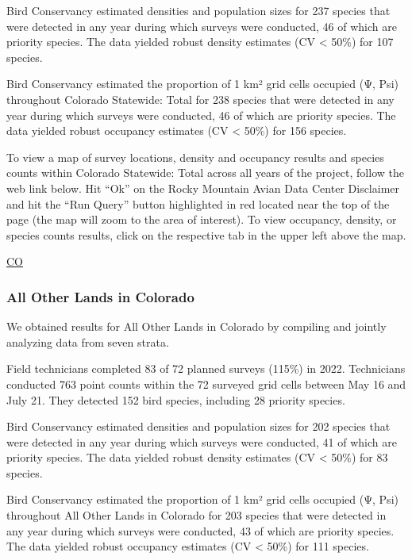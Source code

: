 \documentclass[
  letterpaper,
  DIV=11,
  numbers=noendperiod,
  oneside]{scrreprt}
\begin{document}
Bird Conservancy estimated densities and population sizes for 237
species that were detected in any year during which surveys were
conducted, 46 of which are priority species. The data yielded robust
density estimates (CV \textless{} 50\%) for 107 species.

Bird Conservancy estimated the proportion of 1 km² grid cells occupied
(Ψ, Psi) throughout Colorado Statewide: Total for 238 species that were
detected in any year during which surveys were conducted, 46 of which
are priority species. The data yielded robust occupancy estimates (CV
\textless{} 50\%) for 156 species.

To view a map of survey locations, density and occupancy results and
species counts within Colorado Statewide: Total across all years of the
project, follow the web link below. Hit ``Ok'' on the Rocky Mountain
Avian Data Center Disclaimer and hit the ``Run Query'' button
highlighted in red located near the top of the page (the map will zoom
to the area of interest). To view occupancy, density, or species counts
results, click on the respective tab in the upper left above the map.

\href{http://www.rmbo.org/new_site/adc/QueryWindow.aspx\#N4IgzgrgDgpgTmALnAhoiBbEAuABCAYQHkQBfIA=}{CO}

\hypertarget{all-other-lands-in-colorado}{%
\subsubsection{All Other Lands in
Colorado}\label{all-other-lands-in-colorado}}

We obtained results for All Other Lands in Colorado by compiling and
jointly analyzing data from seven strata.

Field technicians completed 83 of 72 planned surveys (115\%) in 2022.
Technicians conducted 763 point counts within the 72 surveyed grid cells
between May 16 and July 21. They detected 152 bird species, including 28
priority species.

Bird Conservancy estimated densities and population sizes for 202
species that were detected in any year during which surveys were
conducted, 41 of which are priority species. The data yielded robust
density estimates (CV \textless{} 50\%) for 83 species.

Bird Conservancy estimated the proportion of 1 km² grid cells occupied
(Ψ, Psi) throughout All Other Lands in Colorado for 203 species that
were detected in any year during which surveys were conducted, 43 of
which are priority species. The data yielded robust occupancy estimates
(CV \textless{} 50\%) for 111 species.
\end{document}
